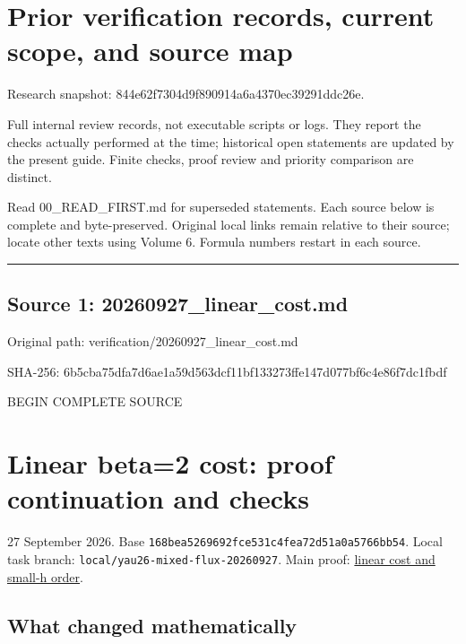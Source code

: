 \documentclass[
  10pt,
]{article}
\author{}
\date{}
\begin{document}
\hypertarget{prior-verification-records-current-scope-and-source-map}{%
\section{Prior verification records, current scope, and source
map}\label{prior-verification-records-current-scope-and-source-map}}

Research snapshot: 844e62f7304d9f890914a6a4370ec39291ddc26e.

Full internal review records, not executable scripts or logs. They
report the checks actually performed at the time; historical open
statements are updated by the present guide. Finite checks, proof review
and priority comparison are distinct.

Read 00\_READ\_FIRST.md for superseded statements. Each source below is
complete and byte-preserved. Original local links remain relative to
their source; locate other texts using Volume 6. Formula numbers restart
in each source.

\begin{center}\rule{0.5\linewidth}{0.5pt}\end{center}

\hypertarget{source-1-20260927_linear_cost.md}{%
\subsection{Source 1:
20260927\_linear\_cost.md}\label{source-1-20260927_linear_cost.md}}

Original path: verification/20260927\_linear\_cost.md

SHA-256:
6b5cba75dfa7d6ae1a59d563dcf11bf133273ffe147d077bf6c4e86f7dc1fbdf

BEGIN COMPLETE SOURCE

\hypertarget{linear-beta2-cost-proof-continuation-and-checks}{%
\section{Linear beta=2 cost: proof continuation and
checks}\label{linear-beta2-cost-proof-continuation-and-checks}}

27 September 2026. Base
\texttt{168bea5269692fce531c4fea72d51a0a5766bb54}. Local task branch:
\texttt{local/yau26-mixed-flux-20260927}. Main proof:
\href{../continuation/20260927_mixed_current_and_signed_cores.md}{linear
cost and small-h order}.

\hypertarget{what-changed-mathematically}{%
\subsection{What changed
mathematically}\label{what-changed-mathematically}}
\end{document}
